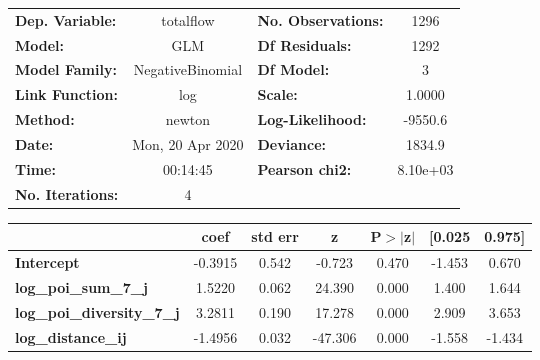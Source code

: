 \begin{center}
\begin{tabular}{lclc}
\toprule
\textbf{Dep. Variable:}            &    totalflow     & \textbf{  No. Observations:  } &     1296    \\
\textbf{Model:}                    &       GLM        & \textbf{  Df Residuals:      } &     1292    \\
\textbf{Model Family:}             & NegativeBinomial & \textbf{  Df Model:          } &        3    \\
\textbf{Link Function:}            &       log        & \textbf{  Scale:             } &    1.0000   \\
\textbf{Method:}                   &      newton      & \textbf{  Log-Likelihood:    } &   -9550.6   \\
\textbf{Date:}                     & Mon, 20 Apr 2020 & \textbf{  Deviance:          } &    1834.9   \\
\textbf{Time:}                     &     00:14:45     & \textbf{  Pearson chi2:      } &  8.10e+03   \\
\textbf{No. Iterations:}           &        4         & \textbf{                     } &             \\
\bottomrule
\end{tabular}
\begin{tabular}{lcccccc}
                                   & \textbf{coef} & \textbf{std err} & \textbf{z} & \textbf{P$> |$z$|$} & \textbf{[0.025} & \textbf{0.975]}  \\
\midrule
\textbf{Intercept}                 &      -0.3915  &        0.542     &    -0.723  &         0.470        &       -1.453    &        0.670     \\
\textbf{log\_poi\_sum\_7\_j}       &       1.5220  &        0.062     &    24.390  &         0.000        &        1.400    &        1.644     \\
\textbf{log\_poi\_diversity\_7\_j} &       3.2811  &        0.190     &    17.278  &         0.000        &        2.909    &        3.653     \\
\textbf{log\_distance\_ij}         &      -1.4956  &        0.032     &   -47.306  &         0.000        &       -1.558    &       -1.434     \\
\bottomrule
\end{tabular}
\end{center}